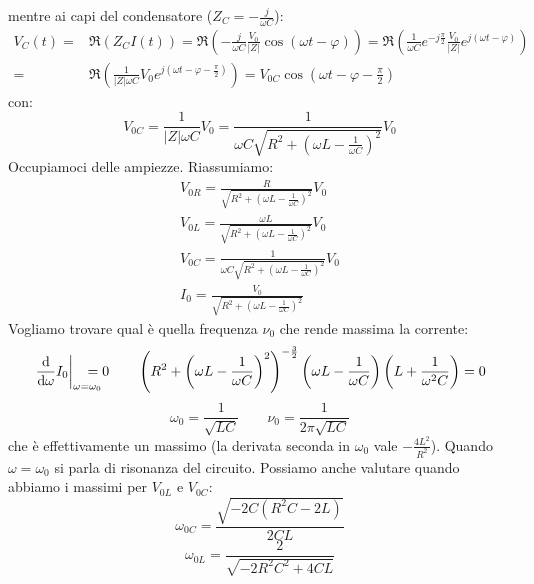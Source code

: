 mentre ai capi del condensatore ($Z_C=-\frac{j}{\omega C}$):
\begin{equation}
\begin{split}
V_{C}(t)=&\Re(Z_CI(t))=\Re\left(-\frac{j}{\omega C}\frac{V_0}{|Z|}\cos(\omega t-\varphi)\right)=\Re\left(\frac{1}{\omega C}e^{-j\frac{\pi}{2}}\frac{V_0}{|Z|}e^{j(\omega t-\varphi)}\right)\\
=&\Re\left(\frac{1}{|Z|\omega C}V_0e^{j\left(\omega t-\varphi-\frac{\pi}{2}\right)}\right)=V_{0C}\cos\left(\omega t-\varphi-\frac{\pi}{2}\right)
\end{split}
\end{equation}
con:
\begin{equation}
V_{0C}=\frac{1}{|Z|\omega C}V_0=\frac{1}{\omega C\sqrt{R^2+\left(\omega L-\frac{1}{\omega C}\right)^2}}V_0
\end{equation}
Occupiamoci delle ampiezze. Riassumiamo:
\begin{subequations}
\begin{gather}
V_{0R}=\frac{R}{\sqrt{R^2+\left(\omega L-\frac{1}{\omega C}\right)^2}}V_0\\
V_{0L}=\frac{\omega L}{\sqrt{R^2+\left(\omega L-\frac{1}{\omega C}\right)^2}}V_0\\
V_{0C}=\frac{1}{\omega C\sqrt{R^2+\left(\omega L-\frac{1}{\omega C}\right)^2}}V_0\\
I_0=\frac{V_0}{\sqrt{R^2+\left(\omega L-\frac{1}{\omega C}\right)^2}}
\end{gather}
\end{subequations}
Vogliamo trovare qual è quella frequenza $\nu_0$ che rende massima la corrente:
\begin{equation*}
\left.\frac{\ud}{\ud \omega}I_0\right|_{\omega=\omega_0}\!\!\!\!\!\!\!\!=0\qquad
\left(R^2+\left(\omega L-\frac{1}{\omega C}\right)^2\right)^{-\frac{3}{2}}\left(\omega L-\frac{1}{\omega C}\right)\left(L+\frac{1}{\omega ^2 C}\right)=0
\end{equation*}
\begin{equation}
\omega_0=\frac{1}{\sqrt{LC}}\qquad \nu_0=\frac{1}{2\pi\sqrt{LC}}
\end{equation}
che è effettivamente un massimo (la derivata seconda in $\omega_0$ vale $-\frac{4L^2}{R^2}$). Quando $\omega=\omega_0$ si parla di risonanza del circuito.
Possiamo anche valutare quando abbiamo i massimi per $V_{0L}$ e $V_{0C}$:
\begin{equation}
\omega_{0C}=\frac{\sqrt{-2C(R^2C-2L)}}{2CL}
\end{equation}
\begin{equation}
\omega_{0L}=\frac{2}{\sqrt{-2R^2C^2+4CL}}
\end{equation}
